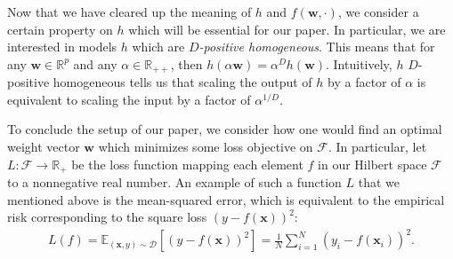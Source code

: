 \documentclass{article}
\begin{document}
Now that we have cleared up the meaning of $h$ and $f(\boldsymbol{w}, \cdot)$, we consider a certain property on $h$ which will be essential for our paper. In particular, we are interested in models $h$ which are \textit{$D$-positive homogeneous}. This means that for any $\boldsymbol{w} \in \mathbb{R}^p$ and any $\alpha \in \mathbb{R}_{++}$, then $h(\alpha \boldsymbol{w}) = \alpha^D h(\boldsymbol{w})$. Intuitively, $h$ $D$-positive homogeneous tells us that scaling the output of $h$ by a factor of $\alpha$ is equivalent to scaling the input by a factor of $\alpha^{1/D}$.

To conclude the setup of our paper, we consider how one would find an optimal weight vector $\boldsymbol{w}$ which minimizes some loss objective on $\mathcal{F}$. In particular, let $L: \mathcal{F} \rightarrow \mathbb{R}_+$ be the loss function mapping each element $f$ in our Hilbert space $\mathcal{F}$ to a nonnegative real number. An example of such a function $L$ that we mentioned above is the mean-squared error, which is equivalent to the empirical risk corresponding to the square loss $(y - f(\boldsymbol{x}))^2$:
\begin{align}
   L(f) = \mathbb{E}_{(\boldsymbol{x}, y) \sim \mathcal{D}} \left[ \left(y - f(\boldsymbol{x}) \right)^2 \right] = \frac{1}{N}\sum_{i=1}^N (y_i - f(\boldsymbol{x}_i))^2.\label{mse}
\end{align}
\end{document}
